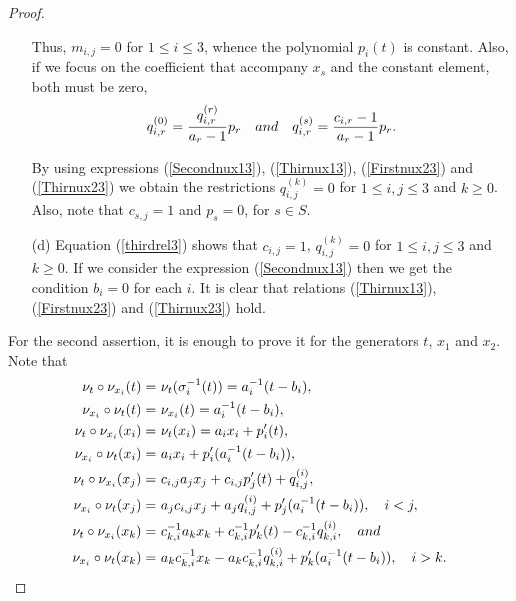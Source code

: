 \documentclass{amsart}
\theoremstyle{definition}
\theoremstyle{remark}
\numberwithin{equation}{section}
\begin{document}
\begin{proof}
\begin{enumerate}
    Thus, $m_{i,j}=0$ for $1 \leq i \leq 3$, whence the polynomial $p_i(t)$ is constant. Also, if we focus on the coefficient that accompany $x_s$ and the constant element, both must be zero, 
    \begin{equation*}
        q_{i,r}^{(0)}=\frac{q_{i,r}^{(r)}}{a_r-1}p_r \quad {\rm and} \quad q_{i,r}^{(s)}=\frac{c_{i,r}-1}{a_r-1}p_r.
    \end{equation*}
    
By using expressions {\rm (}\ref{Secondnux13}{\rm )}, {\rm (}\ref{Thirnux13}{\rm )}, {\rm (}\ref{Firstnux23}{\rm )} and  {\rm (}\ref{Thirnux23}{\rm )} we obtain the restrictions $q_{i,j}^{(k)}=0$ for $1\leq i,j \leq 3$ and $k\geq 0$. Also, note that $c_{s,j}=1$ and $p_s=0$, for $s \in S$.
    
\item [\rm (d)] Equation (\ref{thirdrel3}) shows that $c_{i,j}=1$, $q_{i,j}^{(k)}=0$ for $1\leq i,j \leq 3$ and $k\geq 0$. If we consider the expression {\rm (}\ref{Secondnux13}{\rm )} then we get the condition $b_i = 0$ for each $i$. It is clear that relations {\rm (}\ref{Thirnux13}{\rm )}, {\rm (}\ref{Firstnux23}{\rm )} and {\rm (}\ref{Thirnux23}{\rm )} hold.
\end{enumerate}

For the second assertion, it is enough to prove it for the generators $t$, $x_1$ and $x_2$. Note that 
\begin{align}
    \nu_t \circ \nu_{x_i}(t) = &\ \nu_t(\sigma_i^{-1}(t))=a_i^{-1}(t-b_i), \label{comp113.}\\
    \nu_{x_i} \circ \nu_t(t) = &\ \nu_{x_i}(t) = a_i^{-1}(t-b_i), \label{comp113} \\
    \nu_t \circ \nu_{x_i}(x_i) = &\ \nu_t(x_i)=a_ix_i+p_i'(t), \label{comp123.} \\ \nu_{x_i} \circ \nu_t(x_i) = &\ a_ix_i+p_i'(a_i^{-1}(t-b_i)), \label{comp123} \\
    \nu_t \circ \nu_{x_i}(x_j) = &\ c_{i,j}a_jx_j+c_{i,j}p_j'(t) + q_{i,j}^{(i)}, \label{comp133.} \\ 
    \nu_{x_i} \circ \nu_t(x_j) = &\ a_jc_{i,j}x_j+a_jq_{i,j}^{(i)}+p_j'(a_{i}^{-1}(t-b_i)), \quad i < j, \label{comp133} \\
    \nu_t \circ \nu_{x_i}(x_k) = &\ c_{k,i}^{-1}a_kx_k+c_{k,i}^{-1}p_k'(t)-c_{k,i}^{-1}q_{k,i}^{(i)}, \quad {\rm and} \label{comp143.} \\
    \nu_{x_i} \circ \nu_t(x_k) = &\ a_kc_{k,i}^{-1}x_k-a_kc_{k,i}^{-1}q_{k,i}^{(i)}+p_k'(a_{i}^{-1}(t-b_i)), \quad i > k.\label{comp143}
\end{align}


\end{proof}
\end{document}
